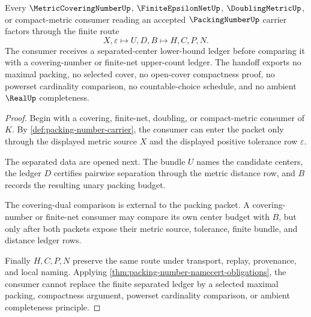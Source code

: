 \begin{theorem}
\label{thm:packing-number-covering-dual-handoff}
Every $\MetricCoveringNumberUp$, $\FiniteEpsilonNetUp$, $\DoublingMetricUp$, or compact-metric consumer reading an accepted $\PackingNumberUp$ carrier factors through the finite route
$$
X,\varepsilon \longmapsto U,D,B \longmapsto H,C,P,N .
$$
The consumer receives a separated-center lower-bound ledger before comparing it with a covering-number or finite-net upper-count ledger. The handoff exports no maximal packing, no selected cover, no open-cover compactness proof, no powerset cardinality comparison, no countable-choice schedule, and no ambient $\RealUp$ completeness.
\end{theorem}
\begin{proof}
Begin with a covering, finite-net, doubling, or compact-metric consumer of $K$. By \autoref{def:packing-number-carrier}, the consumer can enter the packet only through the displayed metric source $X$ and the displayed positive tolerance row $\varepsilon$.

The separated data are opened next. The bundle $U$ names the candidate centers, the ledger $D$ certifies pairwise separation through the metric distance row, and $B$ records the resulting unary packing budget.

The covering-dual comparison is external to the packing packet. A covering-number or finite-net consumer may compare its own center budget with $B$, but only after both packets expose their metric source, tolerance, finite bundle, and distance ledger rows.

Finally $H,C,P,N$ preserve the same route under transport, replay, provenance, and local naming. Applying \autoref{thm:packing-number-namecert-obligations}, the consumer cannot replace the finite separated ledger by a selected maximal packing, compactness argument, powerset cardinality comparison, or ambient completeness principle.
\end{proof}


